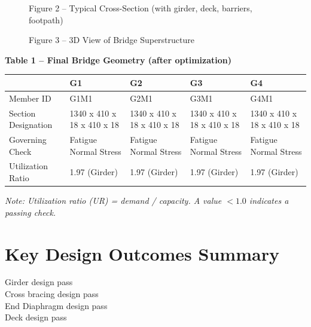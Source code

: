 \documentclass[12pt,a4paper]{report}
\numberwithin{table}{chapter}
\numberwithin{figure}{chapter}
\begin{document}
\newpage

\begin{figure}[H]
\centering
{}
\caption*{Figure 2 -- Typical Cross-Section (with girder, deck, barriers, footpath)}
\end{figure}

\begin{figure}[H]
\centering
{}
\caption*{Figure 3 -- 3D View of Bridge Superstructure}
\end{figure}

\noindent\textbf{Table 1 -- Final Bridge Geometry (after optimization)}

\vspace{0.4em}
\noindent
\begin{tabular}{|C{2.8cm}|C{3.0cm}|C{3.0cm}|C{3.0cm}|C{3.0cm}|}
\hline
  \textbf{} &
  \textbf{G1} &
  \textbf{G2} &
  \textbf{G3} &
  \textbf{G4} \\
\hline
Member ID & G1M1 & G2M1 & G3M1 & G4M1 \\
\hline
Section Designation & 1340 x 410 x 18 x 410 x 18 & 1340 x 410 x 18 x 410 x 18 & 1340 x 410 x 18 x 410 x 18 & 1340 x 410 x 18 x 410 x 18 \\
\hline
Governing Check & Fatigue Normal Stress & Fatigue Normal Stress & Fatigue Normal Stress & Fatigue Normal Stress \\
\hline
Utilization Ratio & 1.97 (Girder) & 1.97 (Girder) & 1.97 (Girder) & 1.97 (Girder) \\
\hline
\end{tabular}

\vspace{0.4em}
\noindent\textit{Note: Utilization ratio (UR) = demand / capacity. A value $< 1.0$ indicates a passing check.}

\vspace{1em}

\section*{Key Design Outcomes Summary}
\label{sec:key-outcomes}

\noindent Girder design pass \\
Cross bracing design pass \\
End Diaphragm design pass \\
Deck design pass
\end{document}
